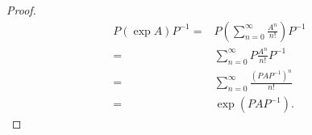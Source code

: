 \begin{tleftbar}
    \begin{proof}
        \begin{align*}
            P (\exp A)P^{-1} ={} & P\left(\sum_{n = 0}^\infty \frac{A^n}{n!}\right) P^{-1} \\
            ={}                  & \sum_{n = 0}^\infty P \frac{A^n}{n!} P^{-1}             \\
            ={}                  & \sum_{n = 0}^\infty \frac{(PAP^{-1})^n}{n!}             \\
            ={}                  & \exp(PAP^{-1}).
        \end{align*}
    \end{proof}
\end{tleftbar}